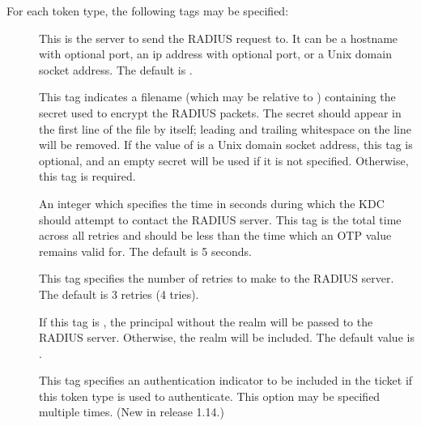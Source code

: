 \documentclass[letterpaper,10pt,english]{sphinxmanual}
\begin{document}
For each token type, the following tags may be specified:
\begin{description}
\item[{}] \leavevmode
This is the server to send the RADIUS request to.  It can be a
hostname with optional port, an ip address with optional port, or
a Unix domain socket address.  The default is
{\hyperref[\detokenize{mitK5defaults:paths}]{}}.

\item[{}] \leavevmode
This tag indicates a filename (which may be relative to {\hyperref[\detokenize{mitK5defaults:paths}]{}})
containing the secret used to encrypt the RADIUS packets.  The
secret should appear in the first line of the file by itself;
leading and trailing whitespace on the line will be removed.  If
the value of  is a Unix domain socket address, this tag
is optional, and an empty secret will be used if it is not
specified.  Otherwise, this tag is required.

\item[{}] \leavevmode
An integer which specifies the time in seconds during which the
KDC should attempt to contact the RADIUS server.  This tag is the
total time across all retries and should be less than the time
which an OTP value remains valid for.  The default is 5 seconds.

\item[{}] \leavevmode
This tag specifies the number of retries to make to the RADIUS
server.  The default is 3 retries (4 tries).

\item[{}] \leavevmode
If this tag is , the principal without the realm will be
passed to the RADIUS server.  Otherwise, the realm will be
included.  The default value is .

\item[{}] \leavevmode
This tag specifies an authentication indicator to be included in
the ticket if this token type is used to authenticate.  This
option may be specified multiple times.  (New in release 1.14.)

\end{description}
\end{document}
